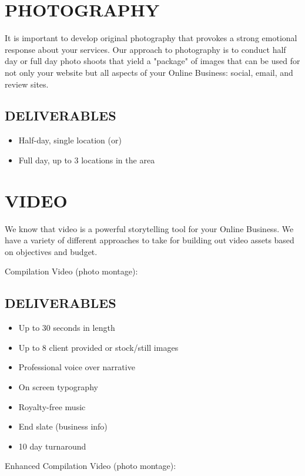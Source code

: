 \documentclass[12pt]{report}
\begin{document}
\section{PHOTOGRAPHY}
\item It is important to develop original photography that provokes a strong emotional response about your services. Our approach to photography is to conduct half day or full day photo shoots that yield a "package" of images that can be used for not only your website but all aspects of your Online Business: social, email, and review sites.
\subsection{DELIVERABLES}
\begin{itemize}
\item Half-day, single location (or)
\item Full day, up to 3 locations in the area
\end{itemize}

\section{VIDEO}
\item We know that video is a powerful storytelling tool for your Online Business. We have a variety of different approaches to take for building out video assets based on objectives and budget.
\item Compilation Video (photo montage):
\subsection{DELIVERABLES}
\begin{itemize}
\item Up to 30 seconds in length
\item Up to 8 client provided or stock/still images
\item Professional voice over narrative
\item On screen typography
\item Royalty-free music
\item End slate (business info)
\item 10 day turnaround
\end{itemize}

\item Enhanced Compilation Video (photo montage):
\end{document}
